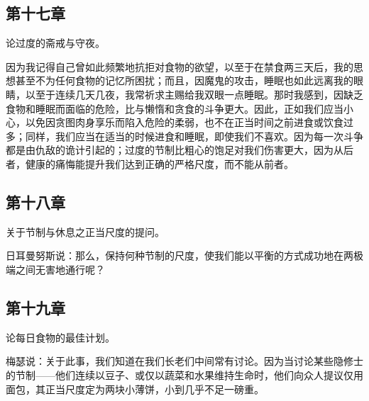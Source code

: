 
\subsection{第十七章}

论过度的斋戒与守夜。\par

因为我记得自己曾如此频繁地抗拒对食物的欲望，以至于在禁食两三天后，我的思想甚至不为任何食物的记忆所困扰；而且，因魔鬼的攻击，睡眠也如此远离我的眼睛，以至于连续几天几夜，我常祈求主赐给我双眼一点睡眠。那时我感到，因缺乏食物和睡眠而面临的危险，比与懒惰和贪食的斗争更大。因此，正如我们应当小心，以免因贪图肉身享乐而陷入危险的柔弱，也不在正当时间之前进食或饮食过多；同样，我们应当在适当的时候进食和睡眠，即使我们不喜欢。因为每一次斗争都是由仇敌的诡计引起的；过度的节制比粗心的饱足对我们伤害更大，因为从后者，健康的痛悔能提升我们达到正确的严格尺度，而不能从前者。\par


\subsection{第十八章}

关于节制与休息之正当尺度的提问。\par

日耳曼努斯说：那么，保持何种节制的尺度，使我们能以平衡的方式成功地在两极端之间无害地通行呢？\par


\subsection{第十九章}

论每日食物的最佳计划。\par

梅瑟说：关于此事，我们知道在我们长老们中间常有讨论。因为当讨论某些隐修士的节制——他们连续以豆子、或仅以蔬菜和水果维持生命时，他们向众人提议仅用面包，其正当尺度定为两块小薄饼，小到几乎不足一磅重。\par


